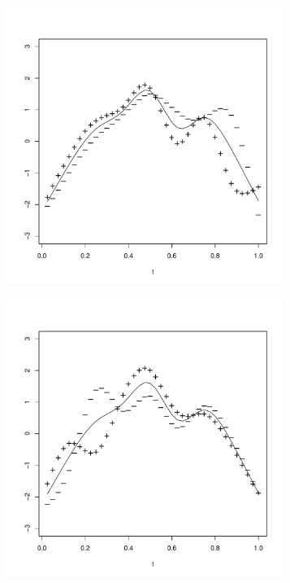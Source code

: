 \begin{figure}
        \begin{subfigure}[b]{0.32\textwidth}
                \centering
                \includegraphics[width=0.99\textwidth]{Images-future-work/ef3pn.pdf}
                \caption{}
                \label{}
        \end{subfigure}
         \begin{subfigure}[b]{0.32\textwidth}
                \centering
                \includegraphics[width=0.99\textwidth]{Images-future-work/ef4pn.pdf}

\end{subfigure}
\end{figure}
